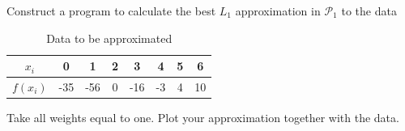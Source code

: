 \begin{problem}
  Construct a program to calculate the best $L_1$ approximation in
  $\mathcal{P}_1$ to the data
  
  \begin{table}[!ht]
    \caption{Data to be approximated}
    \label{tab:data}
    \begin{center}
      \begin{tabular}{| c | c  c c c c c c | }
        \hline			
        $x_i$ & 0 & 1 & 2 & 3 &4 & 5 & 6 \\
        \hline
        $f(x_i)$ & -35 & -56 & 0 & -16 & -3 & 4 & 10 \\
        \hline  
      \end{tabular}
    \end{center}
  \end{table}
  Take all weights equal to one. Plot your approximation together with the data.
\end{problem}


